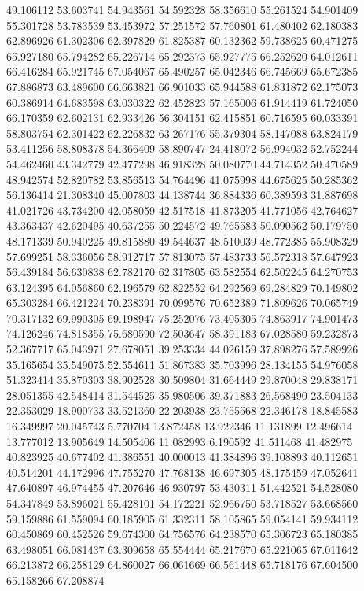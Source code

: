 49.106112
53.603741
54.943561
54.592328
58.356610
55.261524
54.901409
55.301728
53.783539
53.453972
57.251572
57.760801
61.480402
62.180383
62.896926
61.302306
62.397829
61.825387
60.132362
59.738625
60.471275
65.927180
65.794282
65.226714
65.292373
65.927775
66.252620
64.012611
66.416284
65.921745
67.054067
65.490257
65.042346
66.745669
65.672385
67.886873
63.489600
66.663821
66.901033
65.944588
61.831872
62.175073
60.386914
64.683598
63.030322
62.452823
57.165006
61.914419
61.724050
66.170359
62.602131
62.933426
56.304151
62.415851
60.716595
60.033391
58.803754
62.301422
62.226832
63.267176
55.379304
58.147088
63.824179
53.411256
58.808378
54.366409
58.890747
24.418072
56.994032
52.752244
54.462460
43.342779
42.477298
46.918328
50.080770
44.714352
50.470589
48.942574
52.820782
53.856513
54.764496
41.075998
44.675625
50.285362
56.136414
21.308340
45.007803
44.138744
36.884336
60.389593
31.887698
41.021726
43.734200
42.058059
42.517518
41.873205
41.771056
42.764627
43.363437
42.620495
40.637255
50.224572
49.765583
50.090562
50.179750
48.171339
50.940225
49.815880
49.544637
48.510039
48.772385
55.908329
57.699251
58.336056
58.912717
57.813075
57.483733
56.572318
57.647923
56.439184
56.630838
62.782170
62.317805
63.582554
62.502245
64.270753
63.124395
64.056860
62.196579
62.822552
64.292569
69.284829
70.149802
65.303284
66.421224
70.238391
70.099576
70.652389
71.809626
70.065749
70.317132
69.990305
69.198947
75.252076
73.405305
74.863917
74.901473
74.126246
74.818355
75.680590
72.503647
58.391183
67.028580
59.232873
52.367717
65.043971
27.678051
39.253334
44.026159
37.898276
57.589926
35.165654
35.549075
52.554611
51.867383
35.703996
28.134155
54.976058
51.323414
35.870303
38.902528
30.509804
31.664449
29.870048
29.838171
28.051355
42.548414
31.544525
35.980506
39.371883
26.568490
23.504133
22.353029
18.900733
33.521360
22.203938
23.755568
22.346178
18.845583
16.349997
20.045743
5.770704
13.872458
13.922346
11.131899
12.496614
13.777012
13.905649
14.505406
11.082993
6.190592
41.511468
41.482975
40.823925
40.677402
41.386551
40.000013
41.384896
39.108893
40.112651
40.514201
44.172996
47.755270
47.768138
46.697305
48.175459
47.052641
47.640897
46.974455
47.207646
46.930797
53.430311
51.442521
54.528080
54.347849
53.896021
55.428101
54.172221
52.966750
53.718527
53.668560
59.159886
61.559094
60.185905
61.332311
58.105865
59.054141
59.934112
60.450869
60.452526
59.674300
64.756576
64.238570
65.306723
65.180385
63.498051
66.081437
63.309658
65.554444
65.217670
65.221065
67.011642
66.213872
66.258129
64.860027
66.061669
66.561448
65.718176
67.604500
65.158266
67.208874
